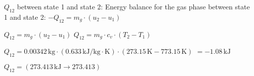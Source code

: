 \( Q_{12} \) between state 1 and state 2:  
Energy balance for the gas phase between state 1 and state 2:  
\( -Q_{12} = m_{g} \cdot (u_{2} - u_{1}) \)  

\( Q_{12} = m_{g} \cdot (u_{2} - u_{1}) \)  
\( Q_{12} = m_{g} \cdot c_{v} \cdot (T_{2} - T_{1}) \)  

\( Q_{12} = 0.00342 \, \text{kg} \cdot (0.633 \, \text{kJ}/\text{kg} \cdot \text{K}) \cdot (273.15 \, \text{K} - 773.15 \, \text{K}) \)  
\( = -1.08 \, \text{kJ} \)  

\( Q_{12} = (273.413 \, \text{kJ} \rightarrow 273.413) \)